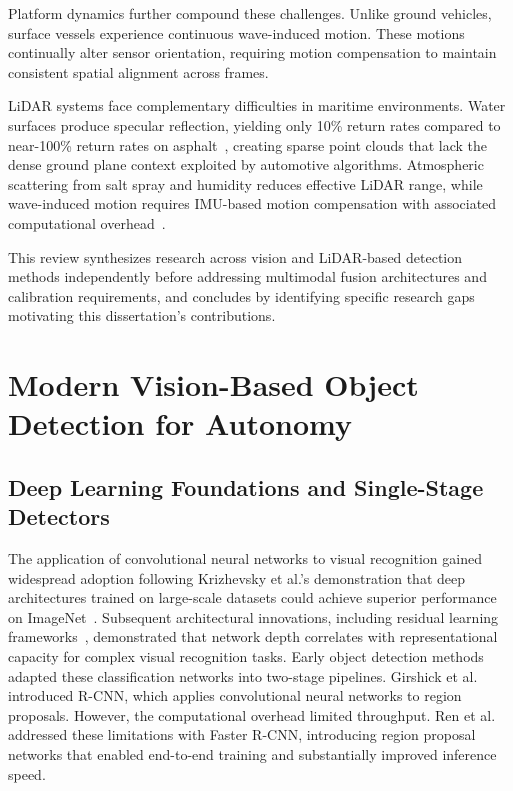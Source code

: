\documentclass[../main.tex]{subfiles}
\begin{document}
Platform dynamics further compound these challenges. 
Unlike ground vehicles, surface vessels experience continuous wave-induced motion. 
These motions continually alter sensor orientation, requiring motion compensation to maintain consistent spatial alignment across frames.

\ac{LiDAR} systems face complementary difficulties in maritime environments.
Water surfaces produce specular reflection, yielding only 10\% return rates compared to near-100\% return rates on asphalt~\cite{kunz2005}, creating sparse point clouds that lack the dense ground plane context exploited by automotive algorithms.
Atmospheric scattering from salt spray and humidity reduces effective \ac{LiDAR} range, while wave-induced motion requires IMU-based motion compensation with associated computational overhead~\cite{roriz2022}.

This review synthesizes research across vision and \ac{LiDAR}-based detection methods independently before addressing multimodal fusion architectures and calibration requirements, and concludes by identifying specific research gaps motivating this dissertation's contributions.

\section{Modern Vision-Based Object Detection for Autonomy}

\subsection{Deep Learning Foundations and Single-Stage Detectors}

The application of convolutional neural networks to visual recognition gained widespread adoption following Krizhevsky et al.'s demonstration that deep architectures trained on large-scale datasets could achieve superior performance on ImageNet~\cite{krizhevsky2017}.
Subsequent architectural innovations, including residual learning frameworks~\cite{he2016}, demonstrated that network depth correlates with representational capacity for complex visual recognition tasks.
Early object detection methods adapted these classification networks into two-stage pipelines.
Girshick et al.~\cite{girshick2014} introduced R-CNN, which applies convolutional neural networks to region proposals.
However, the computational overhead limited throughput.
Ren et al.~\cite{ren2016} addressed these limitations with Faster \ac{R-CNN}, introducing region proposal networks that enabled end-to-end training and substantially improved inference speed.
\end{document}
